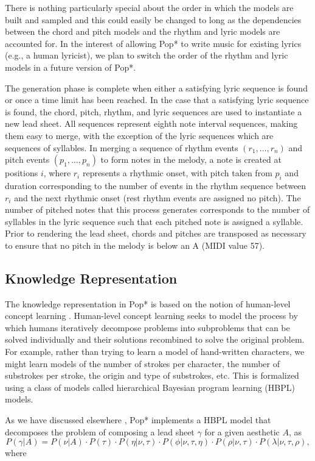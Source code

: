 \documentclass[phd,electronic,oneside,twosidetoc,letterpaper,chaptercenter,parttop,lol,lof,lot]{byumsphd}
\begin{document}
There is nothing particularly special about the order in which the models are built and sampled and this could easily be changed to long as the dependencies between the chord and pitch models and the rhythm and lyric models are accounted for. In the interest of allowing Pop* to write music for existing lyrics (e.g., a human lyricist), we plan to switch the order of the rhythm and lyric models in a future version of Pop*.

The generation phase is complete when either a satisfying lyric sequence is found or once a time limit has been reached. In the case that a satisfying lyric sequence is found, the chord, pitch, rhythm, and lyric sequences are used to instantiate a new lead sheet. All sequences represent eighth note interval sequences, making them easy to merge, with the exception of the lyric sequences which are sequences of syllables. In merging a sequence of rhythm events $(r_1,\dots,r_n)$ and pitch events $(p_1,\dots,p_n)$ to form notes in the melody, a note is created at positions $i$, where $r_i$ represents a rhythmic onset, with pitch taken from $p_i$ and duration corresponding to the number of events in the rhythm sequence between $r_i$ and the next rhythmic onset (rest rhythm events are assigned no pitch). The number of pitched notes that this process generates corresponds to the number of syllables in the lyric sequence such that each pitched note is assigned a syllable. Prior to rendering the lead sheet, chords and pitches are transposed as necessary to ensure that no pitch in the melody is below an A (MIDI value 57).

\subsection{Knowledge Representation}

The knowledge representation in Pop* is based on the notion of human-level concept learning \citep{Lake2015}. Human-level concept learning seeks to model the process by which humans iteratively decompose problems into subproblems that can be solved individually and their solutions recombined to solve the original problem. For example, rather than trying to learn a model of hand-written characters, we might learn models of the number  of strokes per character, the number of substrokes per stroke, the origin and type of substrokes, etc. This is formalized using a class of models called hierarchical Bayesian program learning (HBPL) models.

As we have discussed elsewhere \citep{Bodily2017ComputationalLearning}, Pop* implements a HBPL model that decomposes the problem of composing a lead sheet $\gamma$ for a given aesthetic $A$, as
\[
P(\gamma|A) = P(\nu|A)\cdot P(\tau)\cdot P(\eta|\nu,\tau)\cdot P(\phi|\nu,\tau,\eta)\cdot P(\rho|\nu,\tau)\cdot P(\lambda|\nu,\tau,\rho), 
\]
\noindent where 
\end{document}

